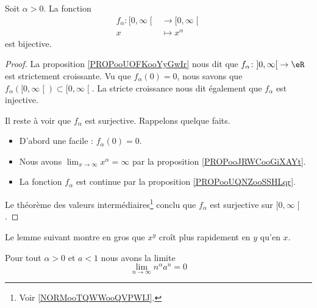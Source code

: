 \begin{proposition}     \label{PROPooEXGKooCqzLor}
	Soit \( \alpha>0\). La fonction
	\begin{equation}
		\begin{aligned}
			f_{\alpha}\colon \mathopen[ 0 , \infty \mathclose[ & \to \mathopen[ 0 , \infty \mathclose[ \\
			x                                                  & \mapsto x^{\alpha}
		\end{aligned}
	\end{equation}
	est bijective.
\end{proposition}

\begin{proof}
	La proposition \ref{PROPooUOFKooYyGwIr} nous dit que \( f_{\alpha}\colon \mathopen] 0 , \infty \mathclose[\to \eR\) est strictement croissante. Vu que  \( f_{\alpha}(0)=0\), nous savons que \( f_{\alpha}(\mathopen[ 0 , \infty \mathclose[)\subset\mathopen[ 0 , \infty \mathclose[\). La stricte croissance nous dit également que \( f_{\alpha}\) est injective.

	Il reste à voir que \( f_{\alpha}\) est surjective. Rappelons quelque faits.
	\begin{itemize}
		\item D'abord une facile :     \( f_{\alpha}(0)=0\).
		\item
		      Nous avons \( \lim_{x\to \infty} x^{\alpha}=\infty\) par la proposition \ref{PROPooJRWCooGiXAYt}.
		\item
		      La fonction \( f_{\alpha}\) est continue par la proposition \ref{PROPooUQNZooSSHLqr}.
	\end{itemize}
	Le théorème des valeurs intermédiaires\footnote{Voir \ref{NORMooTQWWooQVPWIJ}.} conclu que \( f_{\alpha}\) est surjective sur \( \mathopen[ 0 , \infty \mathclose[\).
\end{proof}

Le lemme suivant montre en gros que \( x^y\) croît plus rapidement en \( y\) qu'en \( x\).
\begin{lemma}       \label{LemLJOSooEiNtTs}
	Pour tout \( \alpha>0\) et \( a<1\) nous avons la limite
	\begin{equation}
		\lim_{n\to \infty} n^{\alpha}a^n=0
	\end{equation}
\end{lemma}

